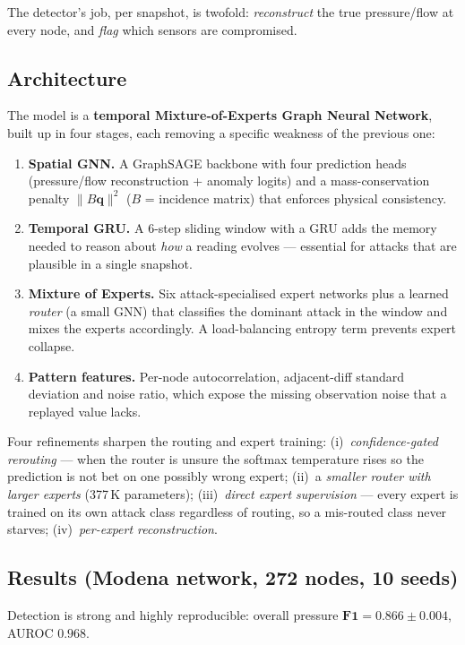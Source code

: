 \documentclass[11pt,a4paper]{article}
\begin{document}
The detector's job, per snapshot, is twofold: \emph{reconstruct} the true
pressure/flow at every node, and \emph{flag} which sensors are
compromised.

\subsection{Architecture}
The model is a \textbf{temporal Mixture-of-Experts Graph Neural Network},
built up in four stages, each removing a specific weakness of the
previous one:

\begin{enumerate}
\item \textbf{Spatial GNN.} A GraphSAGE backbone with four prediction
  heads (pressure/flow reconstruction + anomaly logits) and a
  mass-conservation penalty $\lVert B\mathbf{q}\rVert^2$ ($B$ = incidence
  matrix) that enforces physical consistency.
\item \textbf{Temporal GRU.} A 6-step sliding window with a GRU adds the
  memory needed to reason about \emph{how} a reading evolves --- essential
  for attacks that are plausible in a single snapshot.
\item \textbf{Mixture of Experts.} Six attack-specialised expert networks
  plus a learned \emph{router} (a small GNN) that classifies the dominant
  attack in the window and mixes the experts accordingly. A load-balancing
  entropy term prevents expert collapse.
\item \textbf{Pattern features.} Per-node autocorrelation, adjacent-diff
  standard deviation and noise ratio, which expose the missing observation
  noise that a replayed value lacks.
\end{enumerate}

Four refinements sharpen the routing and expert training:
(i)~\emph{confidence-gated rerouting} --- when the router is unsure the
softmax temperature rises so the prediction is not bet on one possibly
wrong expert; (ii)~a \emph{smaller router with larger experts}
(377\,K parameters); (iii)~\emph{direct expert supervision} --- every
expert is trained on its own attack class regardless of routing, so a
mis-routed class never starves; (iv)~\emph{per-expert reconstruction}.

\newpage
\subsection{Results (Modena network, 272 nodes, 10 seeds)}
Detection is strong and highly reproducible: overall pressure
$\mathbf{F1 = 0.866 \pm 0.004}$, AUROC $0.968$.
\end{document}
